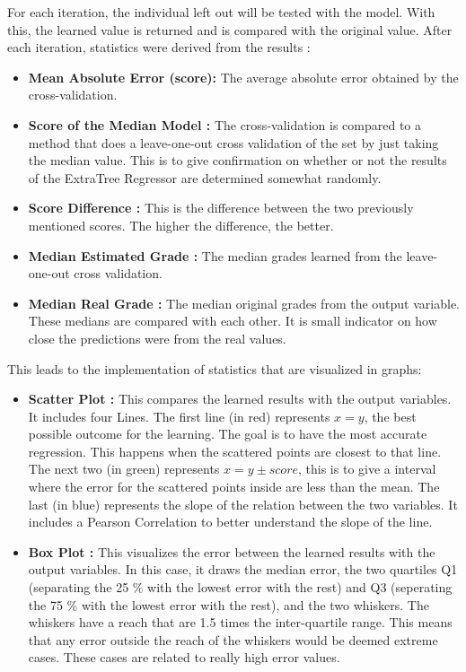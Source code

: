 \documentclass[a4paper,11pt]{report}
\numberwithin{figure}{chapter} %
\begin{document}
\begin{itemize}
        For each iteration, the individual left out will be tested with the model.
        With this, the learned value is returned and is compared with the original value.
        After each iteration, statistics were derived from the results :
        \begin{itemize}
            \item \textbf{Mean Absolute Error (score):} The average absolute error obtained by the cross-validation.
            \item \textbf{Score of the Median Model :} The cross-validation is compared to a method that does a leave-one-out cross validation of the set by just taking the median value.
            This is to give confirmation on whether or not the results of the ExtraTree Regressor are determined somewhat randomly.
            \item \textbf{Score Difference :} This is the difference between the two previously mentioned scores.
            The higher the difference, the better.
            \item \textbf{Median Estimated Grade :} The median grades learned from the leave-one-out cross validation.
            \item \textbf{Median Real Grade :} The median original grades  from the output variable.
            These medians are compared with each other.
            It is small indicator on how close the predictions were from the real values.
        \end{itemize}
        This leads to the implementation of statistics that are visualized in graphs:
        \begin{itemize}
            \item \textbf{Scatter Plot :} This compares the learned results with the output variables.
            It includes four Lines.
            The first line (in red) represents $x = y$, the best possible outcome for the learning.
            The goal is to have the most accurate regression.
            This happens when the scattered points are closest to that line.
            The next two (in green) represents $x = y \pm score$, this is to give a interval where the error for the scattered points inside are less than the mean.
            The last (in blue) represents the slope of the relation between the two variables.
            It includes a Pearson Correlation to better understand the slope of the line.
            \item \textbf{Box Plot :} This visualizes the error between the learned results with the output variables.
            In this case, it draws the median error, the two quartiles Q1 (separating the 25 \% with the lowest error with the rest) and Q3 (seperating the 75 \% with the lowest error with the rest), and the two whiskers.
            The whiskers have a reach that are 1.5 times the inter-quartile range.
            This means that any error outside the reach of the whiskers would be deemed extreme cases.
            These cases are related to really high error values.
        \end{itemize}
    \end{itemize}
\end{document}
